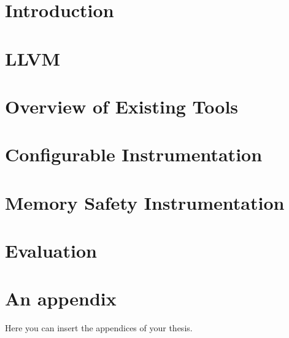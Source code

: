 \documentclass[
  digital, %
  table,   %
  lof,     %
  lot,     %
  nocoveri
]{fithesis3}
\begin{document}
\chapter{Introduction}


  \makeatletter\thesis@blocks@clear\makeatother
  \printindex


\chapter{LLVM}\label{chap:llvm}


\chapter{Overview of Existing Tools}\label{chap:tools}


\chapter{Configurable Instrumentation}\label{chap:instr}


\chapter{Memory Safety Instrumentation}\label{chap:memsafety}


\chapter{Evaluation}\label{chap:eval}

\appendix %
\chapter{An appendix}
Here you can insert the appendices of your thesis.
\end{document}

